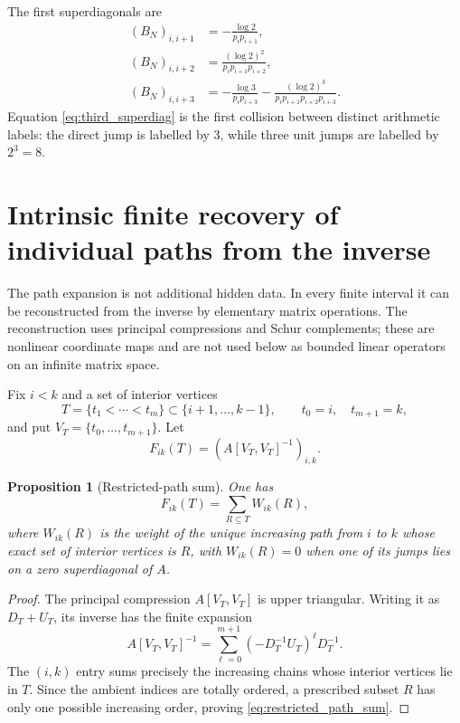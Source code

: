 \documentclass[11pt]{amsart}
\numberwithin{equation}{section}
\theoremstyle{plain}
\newtheorem{proposition}[theorem]{Proposition}
\theoremstyle{definition}
\theoremstyle{remark}
\begin{document}
The first superdiagonals are
\begin{align}
(B_N)_{i,i+1}
&=-\frac{\log2}{p_ip_{i+1}},
\label{eq:first_superdiag}\\
(B_N)_{i,i+2}
&=\frac{(\log2)^2}{p_ip_{i+1}p_{i+2}},
\label{eq:second_superdiag}\\
(B_N)_{i,i+3}
&=-\frac{\log3}{p_ip_{i+3}}
-\frac{(\log2)^3}{p_ip_{i+1}p_{i+2}p_{i+3}}.
\label{eq:third_superdiag}
\end{align}
Equation \eqref{eq:third_superdiag} is the first collision between distinct arithmetic labels: the direct jump is labelled by $3$, while three unit jumps are labelled by $2^3=8$.


\section{Intrinsic finite recovery of individual paths from the inverse}
\label{sec:intrinsic_path_recovery}

The path expansion is not additional hidden data.  In every finite interval it can be reconstructed from the inverse by elementary matrix operations.  The reconstruction uses principal compressions and Schur complements; these are nonlinear coordinate maps and are not used below as bounded linear operators on an infinite matrix space.

Fix $i<k$ and a set of interior vertices
\begin{equation}
T=\{t_1<\cdots<t_m\}\subset\{i+1,\ldots,k-1\},
\qquad t_0=i,\quad t_{m+1}=k,
\label{eq:path_recovery_T}
\end{equation}
and put $V_T=\{t_0,\ldots,t_{m+1}\}$.  Let
\begin{equation}
F_{ik}(T)=\left(A[V_T,V_T]^{-1}\right)_{i,k}.
\label{eq:path_recovery_F}
\end{equation}

\begin{proposition}[Restricted-path sum]
\label{prop:restricted_path_sum}
One has
\begin{equation}
F_{ik}(T)=\sum_{R\subseteq T}W_{ik}(R),
\label{eq:restricted_path_sum}
\end{equation}
where $W_{ik}(R)$ is the weight of the unique increasing path from $i$ to $k$ whose exact set of interior vertices is $R$, with $W_{ik}(R)=0$ when one of its jumps lies on a zero superdiagonal of $A$.
\end{proposition}

\begin{proof}
The principal compression $A[V_T,V_T]$ is upper triangular.  Writing it as $D_T+U_T$, its inverse has the finite expansion
\begin{equation}
A[V_T,V_T]^{-1}
=\sum_{\ell=0}^{m+1}(-D_T^{-1}U_T)^\ell D_T^{-1}.
\label{eq:finite_compressed_neumann}
\end{equation}
The $(i,k)$ entry sums precisely the increasing chains whose interior vertices lie in $T$.  Since the ambient indices are totally ordered, a prescribed subset $R$ has only one possible increasing order, proving \eqref{eq:restricted_path_sum}.
\end{proof}
\end{document}
